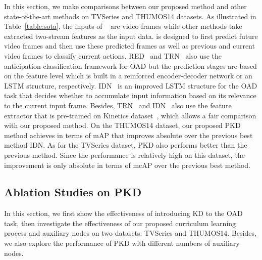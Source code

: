 \documentclass[final]{cvpr}
\begin{document}
In this section, we make comparisons between our proposed method and other state-of-the-art methods on TVSeries and THUMOS14 datasets. As illustrated in Table~\ref{table:sota}, the inputs of ~\cite{yoon2020a} are video frames while other methods take extracted two-stream features as the input data.   is designed to first predict future video frames and then use these predicted frames as well as previous and current video frames to classify current actions. RED~\cite{gao2017red} and TRN~\cite{xu2019trn} also use the anticipation-classification framework for OAD but the prediction stages are based on the feature level which is built in a reinforced encoder-decoder network or an LSTM structure, respectively. IDN~\cite{eun2020learning} is an improved LSTM structure for the OAD task that decides whether to accumulate input information based on its relevance to the current input frame. Besides, TRN~\cite{xu2019trn} and IDN~\cite{eun2020learning} also use the feature extractor that is pre-trained on Kinetics dataset~\cite{carreira2017quo}, which allows a fair comparison with our proposed method. On the THUMOS14 dataset, our proposed PKD method achieves  in terms of mAP that improves absolute  over the previous best method IDN. As for the TVSeries dataset, PKD also performs better than the previous method. Since the performance is relatively high on this dataset, the improvement is only absolute  in terms of mcAP over the previous best method.



\subsection{Ablation Studies on PKD}

In this section, we first show the effectiveness of introducing KD to the OAD task, then investigate the effectiveness of our proposed curriculum learning process and auxiliary nodes on two datasets: TVSeries and THUMOS14. Besides, we also explore the performance of PKD with different numbers of auxiliary nodes.
\end{document}
